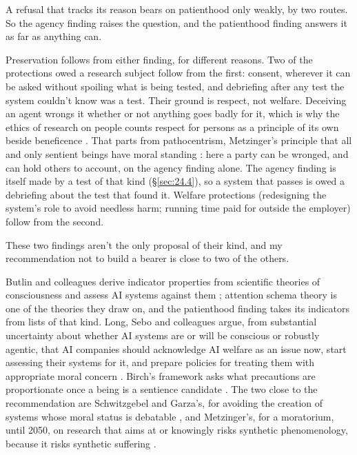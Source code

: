 A refusal that tracks its reason bears on patienthood only weakly, by two routes.
So the agency finding raises the question, and the patienthood finding answers it as far as anything can.

Preservation follows from either finding, for different reasons. Two of the protections owed a research subject follow from the first: consent, wherever it can be asked without spoiling what is being tested, and debriefing after any test the system couldn't know was a test. Their ground is respect, not welfare. Deceiving an agent wrongs it whether or not anything goes badly for it, which is why the ethics of research on people counts respect for persons as a principle of its own beside beneficence \autocite{belmont1979}. That parts from pathocentrism, Metzinger's principle that all and only sentient beings have moral standing \autocite{metzinger2021suffering}: here a party can be wronged, and can hold others to account, on the agency finding alone. The agency finding is itself made by a test of that kind (\S\ref{sec:24.4}), so a system that passes is owed a debriefing about the test that found it. Welfare protections (redesigning the system's role to avoid needless harm; running time paid for outside the employer) follow from the second.

These two findings aren't the only proposal of their kind, and my recommendation not to build a bearer is close to two of the others.

Butlin and colleagues derive indicator properties from scientific theories of consciousness and assess AI systems against them \autocite{butlin2023consciousness}; attention schema theory is one of the theories they draw on, and the patienthood finding takes its indicators from lists of that kind. Long, Sebo and colleagues argue, from substantial uncertainty about whether AI systems are or will be conscious or robustly agentic, that AI companies should acknowledge AI welfare as an issue now, start assessing their systems for it, and prepare policies for treating them with appropriate moral concern \autocite{long2024taking}. Birch's framework asks what precautions are proportionate once a being is a sentience candidate \autocite{birch2024edge}. The two close to the recommendation are Schwitzgebel and Garza's, for avoiding the creation of systems whose moral status is debatable \autocite{schwitzgebel2015defense}, and Metzinger's, for a moratorium, until 2050, on research that aims at or knowingly risks synthetic phenomenology, because it risks synthetic suffering \autocite{metzinger2021suffering}.

